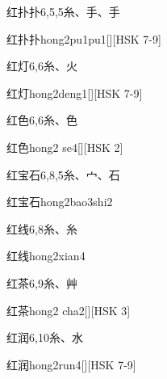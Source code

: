 \begin{Entry}{红扑扑}{6,5,5}{⽷、⼿、⼿}
  \begin{Phonetics}{红扑扑}{hong2pu1pu1}[][HSK 7-9]
  \end{Phonetics}
\end{Entry}

\begin{Entry}{红灯}{6,6}{⽷、⽕}
  \begin{Phonetics}{红灯}{hong2deng1}[][HSK 7-9]
  \end{Phonetics}
\end{Entry}

\begin{Entry}{红色}{6,6}{⽷、⾊}
  \begin{Phonetics}{红色}{hong2 se4}[][HSK 2]
  \end{Phonetics}
\end{Entry}

\begin{Entry}{红宝石}{6,8,5}{⽷、⼧、⽯}
  \begin{Phonetics}{红宝石}{hong2bao3shi2}
  \end{Phonetics}
\end{Entry}

\begin{Entry}{红线}{6,8}{⽷、⽷}
  \begin{Phonetics}{红线}{hong2xian4}
  \end{Phonetics}
\end{Entry}

\begin{Entry}{红茶}{6,9}{⽷、⾋}
  \begin{Phonetics}{红茶}{hong2 cha2}[][HSK 3]
  \end{Phonetics}
\end{Entry}

\begin{Entry}{红润}{6,10}{⽷、⽔}
  \begin{Phonetics}{红润}{hong2run4}[][HSK 7-9]
  \end{Phonetics}
\end{Entry}

